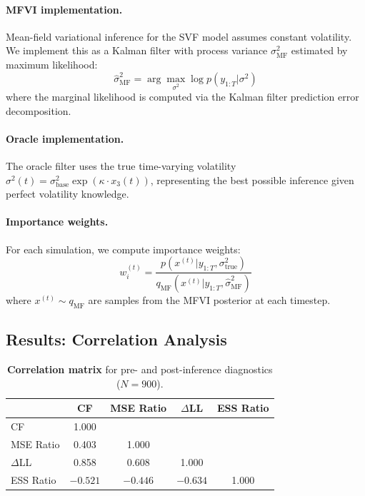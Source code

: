 \documentclass[10pt]{article} %
\theoremstyle{plain}
\theoremstyle{definition}
\begin{document}
\paragraph{MFVI implementation.} Mean-field variational inference for the SVF model assumes constant volatility. We implement this as a Kalman filter with process variance $\sigma^2_{\text{MF}}$ estimated by maximum likelihood:
\begin{equation}
\hat{\sigma}^2_{\text{MF}} = \arg\max_{\sigma^2} \log p(y_{1:T} | \sigma^2)
\end{equation}
where the marginal likelihood is computed via the Kalman filter prediction error decomposition.

\paragraph{Oracle implementation.} The oracle filter uses the true time-varying volatility $\sigma^2(t) = \sigma^2_{\text{base}} \exp(\kappa \cdot x_3(t))$, representing the best possible inference given perfect volatility knowledge.

\paragraph{Importance weights.} For each simulation, we compute importance weights:
\begin{equation}
w_i^{(t)} = \frac{p(x^{(t)} | y_{1:T}, \sigma^2_{\text{true}})}{q_{\text{MF}}(x^{(t)} | y_{1:T}, \hat{\sigma}^2_{\text{MF}})}
\end{equation}
where $x^{(t)} \sim q_{\text{MF}}$ are samples from the MFVI posterior at each timestep.

\subsection{Results: Correlation Analysis}

\begin{table}[!htbp]
\centering
\caption{\textbf{Correlation matrix} for pre- and post-inference diagnostics ($N = 900$).}
\label{tab:correlation-matrix}
\begin{tabular}{lcccc}
\toprule
 & CF & MSE Ratio & $\Delta$LL & ESS Ratio \\
\midrule
CF & 1.000 & & & \\
MSE Ratio & 0.403 & 1.000 & & \\
$\Delta$LL & 0.858 & 0.608 & 1.000 & \\
ESS Ratio & $-0.521$ & $-0.446$ & $-0.634$ & 1.000 \\
\bottomrule
\end{tabular}
\end{table}
\end{document}
